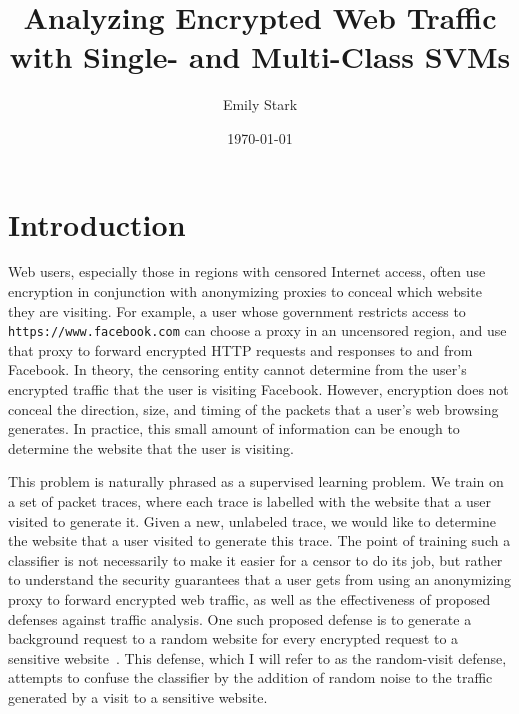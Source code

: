 \documentclass[10pt, twocolumn]{article}
\title{Analyzing Encrypted Web Traffic with Single- and Multi-Class SVMs}
\author{Emily Stark}
\date{\today}                                          %
\begin{document}
\maketitle


\section{Introduction}
Web users, especially those in regions with censored 
Internet access, often use encryption in conjunction 
with anonymizing proxies to conceal which website 
they are visiting. For example, a user whose government 
restricts access to \texttt{https://www.facebook.com} can choose a 
proxy in an uncensored region, and use that proxy to 
forward encrypted HTTP requests and responses to and 
from Facebook. In theory, the censoring entity cannot determine from 
the user's encrypted traffic that the user is visiting 
Facebook. However, encryption does not conceal the direction, 
size, and timing of the packets that a user's web browsing 
generates. In practice, this small amount of information can 
be enough to determine the website that the user is visiting.

This problem is naturally phrased as a supervised learning 
problem. We train on a set of packet traces, where each trace is labelled 
with the website that a user visited to generate it. Given a new,
unlabeled trace, we would 
like to determine the website that a user visited to generate this trace.
 The point of training such a classifier is not 
necessarily to make it easier for a censor to do its job, but rather 
to understand the security guarantees that a user gets from using 
an anonymizing proxy to forward encrypted web traffic, as well as 
the effectiveness of proposed defenses against traffic analysis. 
One such proposed defense is to generate a background request to a 
random website for every encrypted request to a sensitive website~\cite{torfingerprinting}. 
This defense, which I will refer to as the random-visit defense, 
attempts to confuse the classifier by the addition of random 
noise to the traffic generated by a visit to a sensitive website.
\end{document}
